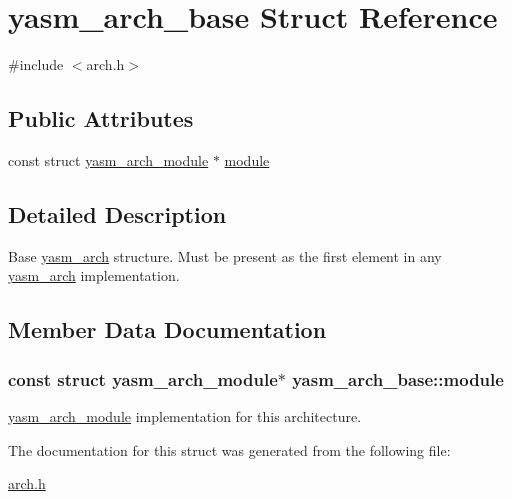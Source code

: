 \hypertarget{structyasm__arch__base}{\section{yasm\-\_\-arch\-\_\-base Struct Reference}
\label{structyasm__arch__base}
}


{\ttfamily \#include $<$arch.\-h$>$}

\subsection*{Public Attributes}
\begin{DoxyCompactItemize}
\item 
const struct \hyperlink{structyasm__arch__module}{yasm\-\_\-arch\-\_\-module} $\ast$ \hyperlink{structyasm__arch__base_a3a1bbe9af0c090f182b05c9610efda13}{module}
\end{DoxyCompactItemize}


\subsection{Detailed Description}
Base \hyperlink{coretype_8h_a8e0de61d73c940f0e7b6ef12e0dc1c70}{yasm\-\_\-arch} structure. Must be present as the first element in any \hyperlink{coretype_8h_a8e0de61d73c940f0e7b6ef12e0dc1c70}{yasm\-\_\-arch} implementation. 

\subsection{Member Data Documentation}
\hypertarget{structyasm__arch__base_a3a1bbe9af0c090f182b05c9610efda13}{
\subsubsection[{module}]{\setlength{\rightskip}{0pt plus 5cm}const struct {\bf yasm\-\_\-arch\-\_\-module}$\ast$ yasm\-\_\-arch\-\_\-base\-::module}}\label{structyasm__arch__base_a3a1bbe9af0c090f182b05c9610efda13}
\hyperlink{structyasm__arch__module}{yasm\-\_\-arch\-\_\-module} implementation for this architecture. 

The documentation for this struct was generated from the following file\-:\begin{DoxyCompactItemize}
\item 
\hyperlink{arch_8h}{arch.\-h}\end{DoxyCompactItemize}
